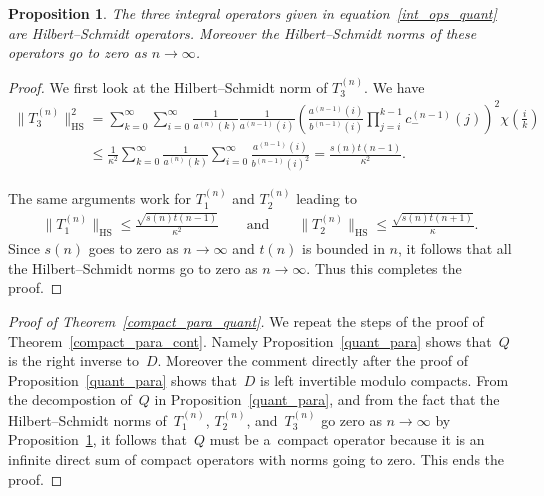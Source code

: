 \documentclass[pdftex]{sigma}
\numberwithin{equation}{section}
\newtheorem{prop}[theo]{Proposition}
{\theoremstyle{definition}
\newtheorem{rem}[theo]{Remark}
\newtheorem{defin}[theo]{Definition}
}
\begin{document}
\begin{prop}
\label{hs_norm_quant_T}
The three integral operators given in equation~\eqref{int_ops_quant} are Hilbert--Schmidt operators.
Moreover the Hilbert--Schmidt norms of these operators go to zero as $n\to\infty$.
\end{prop}

\begin{proof}
We f\/irst look at the Hilbert--Schmidt norm of $T_3^{(n)}$.
We have
\begin{gather*}
\|T_3^{(n)}\|_{\textrm{HS}}^2 = \sum\limits_{k=0}^\infty \sum\limits_{i=0}^\infty
\frac{1}{a^{(n)}(k)}\frac{1}{a^{(n-1)}(i)}\left(\frac{a^{(n-1)}(i)}{b^{(n-1)}(i)}\prod\limits_{j=i}^{k-1}c_-^{(n-1)}(j)\right)^2
\chi\left(\frac{i}{k}\right)
\\
\phantom{\|T_3^{(n)}\|_{\textrm{HS}}^2}
\le \frac{1}{\kappa^2}\sum\limits_{k=0}^\infty
\frac{1}{a^{(n)}(k)}\sum\limits_{i=0}^\infty\frac{a^{(n-1)}(i)}{b^{(n-1)}(i)^2} = \frac{s(n)t(n-1)}{\kappa^2}.
\end{gather*}

The same arguments work for $T_1^{(n)}$ and $T_2^{(n)}$ leading to
\begin{gather*}
\|T_1^{(n)}\|_{\textrm{HS}}\le \frac{\sqrt{s(n)t(n-1)}}{\kappa^2}
\qquad
\textrm{and}
\qquad
\|T_2^{(n)}\|_{\textrm{HS}}\le \frac{\sqrt{s(n)t(n+1)}}{\kappa}.
\end{gather*}
Since $s(n)$ goes to zero as $n\to\infty$ and $t(n)$ is bounded in $n$, it follows that all the Hilbert--Schmidt norms
go to zero as $n\to\infty$.
Thus this completes the proof.
\end{proof}

\begin{proof}[Proof of Theorem~\ref{compact_para_quant}] We repeat the steps of the proof of Theorem~\ref{compact_para_cont}.
Namely Proposition~\ref{quant_para} shows that~$Q$ is the right inverse to~$D$.
Moreover the comment directly after the proof of Proposition~\ref{quant_para} shows that~$D$ is left invertible modulo
compacts.
From the decompostion of~$Q$ in Proposition~\ref{quant_para}, and from the fact that the Hilbert--Schmidt norms of~$T_1^{(n)}$, $T_2^{(n)}$, and~$T_3^{(n)}$ go zero as $n\to\infty$ by Proposition~\ref{hs_norm_quant_T}, it follows that~$Q$ must be a~compact operator because it is an inf\/inite direct sum of compact operators with norms going to zero.
This ends the proof.
\end{proof}
\end{document}
